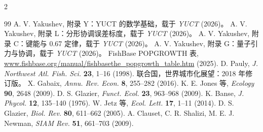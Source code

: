 \documentclass[11pt,a4paper]{article}
\begin{document}
\begin{multicols}{2}
		\begin{thebibliography}{99}
			 A. V. Yakushev, 附录 Y：YUCT 的数学基础，载于 \emph{YUCT} (2026)。
			 A. V. Yakushev, 附录 L：分形协调误差标度，载于 \emph{YUCT} (2026)。
			 A. V. Yakushev, 附录 C：键能与 0.67 定律，载于 \emph{YUCT} (2026)。
			 A. V. Yakushev, 附录 G：量子引力与协调，载于 \emph{YUCT} (2026)。
			 FishBase POPGROWTH 表, \url{www.fishbase.org/manual/fishbasethe_popgrowth_table.htm} (2025).
			 D. Pauly, \emph{J. Northwest Atl. Fish. Sci.} \textbf{23}, 1–16 (1998).
			 联合国，世界城市化展望：2018 年修订版。
			 X. Gabaix, \emph{Annu. Rev. Econ.} \textbf{8}, 255–282 (2016).
			 K. E. Jones 等, \emph{Ecology} \textbf{90}, 2648 (2009).
			 D. S. Glazier, \emph{Funct. Ecol.} \textbf{23}, 963–968 (2009).
			 K. Banse, \emph{J. Phycol.} \textbf{12}, 135–140 (1976).
			 W. Jetz 等, \emph{Ecol. Lett.} \textbf{17}, 1–11 (2014).
			 D. S. Glazier, \emph{Biol. Rev.} \textbf{80}, 611–662 (2005).
			 A. Clauset, C. R. Shalizi, M. E. J. Newman, \emph{SIAM Rev.} \textbf{51}, 661–703 (2009).
		\end{thebibliography}
		
	\end{multicols}
\end{document}
